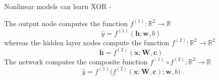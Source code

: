 \begin{frame}[t,allowframebreaks]{Nonlinear models can learn XOR -}
\begin{center}
    \end{center}        

    \framebreak

    The output node computes the function 
    $f^{(1)}: \mathbb{R}^2 \rightarrow \mathbb{R}$
    \begin{equation}
        \hat{y} = 
        f^{(1)}(\mathbf{h};\mathbf{w},b)
        \label{eq:learn_xor_nonlinear_model_f1}
    \end{equation}        
    whereas the hidden layer nodes
    compute the function
    $f^{(2)}: \mathbb{R}^2 \rightarrow \mathbb{R}^2$
    \begin{equation}
        \mathbf{h} = 
        f^{(2)}(\mathbf{x};\mathbf{W},\mathbf{c})
        \label{eq:learn_xor_nonlinear_model_f2}
    \end{equation}        
    The network computes the composite function 
    $f^{(1)} \circ f^{(2)}: \mathbb{R}^2 \rightarrow \mathbb{R}$
    \begin{equation}
        \hat{y} = 
        f^{(1)}\Big(f^{(2)}(\mathbf{x};\mathbf{W},\mathbf{c});\mathbf{w},b\Big)
        \label{eq:learn_xor_nonlinear_model_f1f2}
    \end{equation}        
      

\end{frame}
